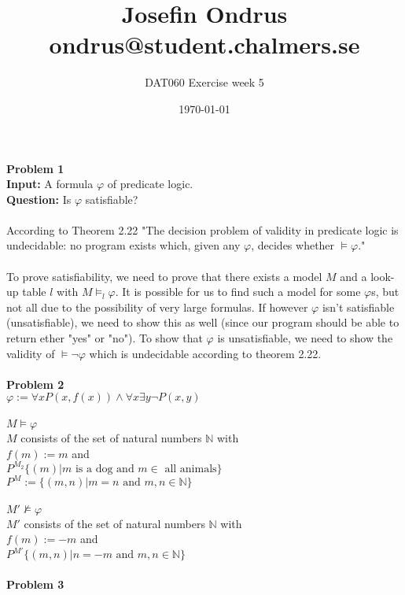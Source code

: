 \documentclass[12pt,oneside,reqno]{amsart}
\begin{document}
\setlength{\parindent}{6pt}
\def\code#1{\texttt{#1}} %
\def\ra{\rightarrow{}} %
\newcommand{\itab}[1]{\hspace{0em}\rlap{#1}}
\newcommand{\tab}[1]{\hspace{.2\textwidth}\rlap{#1}}
\newcommand\deff{\mathrel{\stackrel{\makebox[0pt]{\mbox{\normalfont\tiny def}}}{=}}}
\raggedbottom

\title{Josefin Ondrus\\ondrus@student.chalmers.se}
\author{DAT060 Exercise week 5}
\date{\today}
\maketitle

\textbf{Problem 1}\\
\textbf{Input:} A formula $\varphi$ of predicate logic.\\
\textbf{Question:} Is $\varphi$ satisfiable?\\\\
According to Theorem 2.22 "The decision problem of validity in predicate logic is undecidable:
no program exists which, given any $\varphi$, decides whether $\models \varphi$."\\\\
To prove satisfiability, we need to prove that there exists a model $M$  and a look-up table
$l$ with $M\models_l \varphi$. It is possible for us to find such a model for some $\varphi$s, but not all due to the possibility of very large formulas. If however $\varphi$ isn't satisfiable (unsatisfiable), we need to show this as well (since our program should be able to return ether "yes" or "no"). To show that $\varphi$ is unsatisfiable, we need to show the validity of $\models \neg\varphi$  which is undecidable according to theorem 2.22.\\\\
\textbf{Problem 2}\\
\textbf{$\varphi := \forall xP(x,f(x)) \land \forall x\exists y \neg P(x,y)$}\\\\
\textbf{$M \models \varphi$}\\
$M$ consists of the set of natural numbers $\mathbb{N}$ with\\
$f(m) := m$ and\\$P^{M_2}\{(m)|m \text{ is a dog and } m \in \text{ all animals}\}$
$P^{M} := \{(m,n) | m=n \text{ and } m,n \in \mathbb{N}\}$\\\\
\textbf{$M' \not\models \varphi$}\\
$M'$ consists of the set of natural numbers $\mathbb{N}$ with\\
$f(m) := -m$ and\\
$P^{M'}\{(m,n) | n=-m \text{ and } m,n \in \mathbb{N}\}$\\\\
\newpage
\textbf{Problem 3}\\
\end{document}
